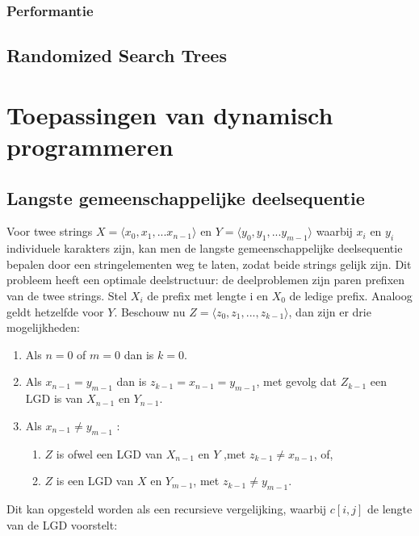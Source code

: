 \documentclass{report}
\begin{document}
	\subsection{Performantie}
	\section{Randomized Search Trees}
	\chapter{Toepassingen van dynamisch programmeren}
	\section{Langste gemeenschappelijke deelsequentie}
 Voor twee strings $X = \langle x_0, x_1, ... x_{n - 1} \rangle$ en $Y = \langle y_0, y_1, ... y_{m - 1} \rangle$ waarbij $x_i$ en $y_i$ individuele karakters zijn, kan men de langste gemeenschappelijke deelsequentie bepalen door een stringelementen weg te laten, zodat beide strings gelijk zijn. Dit probleem heeft een optimale deelstructuur: de deelproblemen zijn paren prefixen van de twee strings. Stel $X_i$ de prefix met lengte i en $X_0$ de ledige prefix. Analoog geldt hetzelfde voor $Y$. Beschouw nu $Z = \langle z_0, z_1, ..., z_{k - 1} \rangle$, dan zijn er drie mogelijkheden:
 \begin{enumerate}
 	\item Als $n = 0$ of $m = 0$ dan is $k = 0$.
 	\item Als $x_{n - 1} = y_{m - 1}$ dan is $z_{k - 1} = x_{n - 1} = y_{m - 1}$, met gevolg dat $Z_{k - 1}$ een LGD is van $X_{n - 1}$ en $Y_{n - 1}$.
 	\item Als $x_{n - 1} \neq y_{m - 1}$ :
 	\begin{enumerate}
 		\item $Z$ is ofwel een LGD van $X_{n - 1}$ en $Y$ ,met $z_{k - 1} \neq x_{n - 1}$, of,
 		\item $Z$ is een LGD van $X$ en $Y_{m - 1}$, met $z_{k - 1} \neq y_{m - 1}$.
 	\end{enumerate}
  \end{enumerate}
 	Dit kan opgesteld worden als een recursieve vergelijking, waarbij $c[i, j]$ de lengte van de LGD voorstelt:
 	
\end{document}
